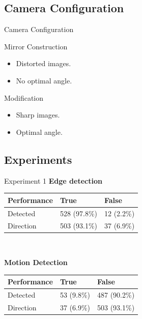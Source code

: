 \documentclass{beamer}
\begin{document}
\subsection{Camera Configuration}
\begin{frame}
\begin{block}{Camera Configuration}
\begin{block}{Mirror Construction}
\begin{itemize}
\item Distorted images.
\item No optimal angle.
\end{itemize}
\end{block}

\begin{block}{Modification}
\begin{itemize}
\item Sharp images.
\item Optimal angle.
\end{itemize}
\end{block}
\end{block}
\end{frame}
\subsection{Experiments}
\begin{frame}
\begin{block}{Experiment 1}
\textbf{Edge detection}\\\vspace{0.1cm}
\begin{tabular}{| l | l | l |}
\hline
\textbf{Performance} & True & False\\
\hline
Detected  & 528 (97.8\%) & 12 (2.2\%)\\
\hline
Direction & 503 (93.1\%) & 37 (6.9\%)\\
\hline
\end{tabular}\\\vspace{0.1cm}

\textbf{Motion Detection}\vspace{0.1cm}

\begin{tabular}{| l | l | l |}
\hline
\textbf{Performance} & True & False\\
\hline
Detected  & 53 (9.8\%) & 487 (90.2\%)\\
\hline
Direction & 37 (6.9\%) & 503 (93.1\%)\\
\hline
\end{tabular}
\end{block}
\end{frame}
\end{document}
